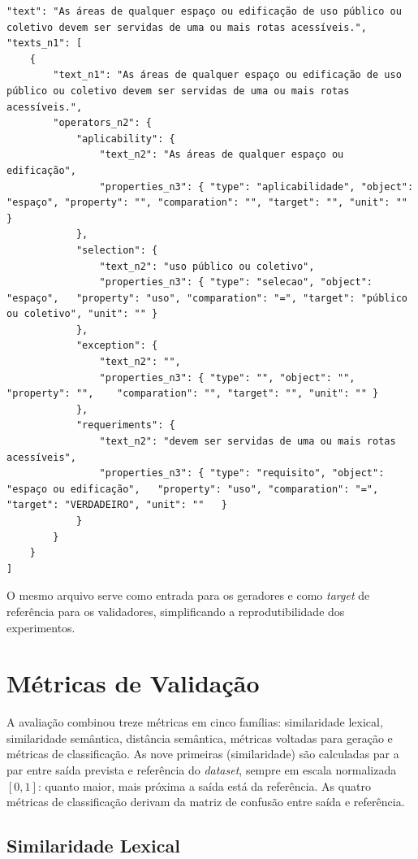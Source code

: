 \begin{lstlisting}[caption={Exemplo de entrada do \textit{dataset} (NBR~9050), com a decomposição RASE de referência nos três níveis.}, label={lst:dataset}]
"text": "As áreas de qualquer espaço ou edificação de uso público ou coletivo devem ser servidas de uma ou mais rotas acessíveis.",
"texts_n1": [
	{
		"text_n1": "As áreas de qualquer espaço ou edificação de uso público ou coletivo devem ser servidas de uma ou mais rotas acessíveis.",
		"operators_n2": {
			"aplicability": {
				"text_n2": "As áreas de qualquer espaço ou edificação",
				"properties_n3": { "type": "aplicabilidade", "object": "espaço", "property": "", "comparation": "", "target": "", "unit": "" }
			},
			"selection": {
				"text_n2": "uso público ou coletivo",
				"properties_n3": { "type": "selecao", "object": "espaço",	"property": "uso", "comparation": "=", "target": "público ou coletivo", "unit": "" }
			},
			"exception": {
				"text_n2": "",
				"properties_n3": { "type": "", "object": "", "property": "",	"comparation": "", "target": "", "unit": ""	}
			},
			"requeriments": {
				"text_n2": "devem ser servidas de uma ou mais rotas acessíveis",
				"properties_n3": { "type": "requisito", "object": "espaço ou edificação",	"property": "uso", "comparation": "=", "target": "VERDADEIRO", "unit": ""	}
			}
		}
	}
]
\end{lstlisting}

O mesmo arquivo serve como entrada para os geradores e como \textit{target} de referência para os validadores, simplificando a reprodutibilidade dos experimentos.

\section{Métricas de Validação}
\label{sec:metricas_validacao}

A avaliação combinou treze métricas em cinco famílias: similaridade lexical, similaridade semântica, distância semântica, métricas voltadas para geração e métricas de classificação. As nove primeiras (similaridade) são calculadas par a par entre saída prevista e referência do \textit{dataset}, sempre em escala normalizada $[0,1]$: quanto maior, mais próxima a saída está da referência. As quatro métricas de classificação derivam da matriz de confusão entre saída e referência.

\subsection{Similaridade Lexical}


